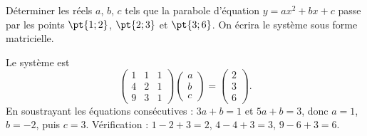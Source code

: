 \begin{exercise}
Déterminer les réels $a$, $b$, $c$ tels que la parabole d'équation $y=ax^2+bx+c$ passe par les points $\pt{1;2}$, $\pt{2;3}$ et $\pt{3;6}$. On écrira le système sous forme matricielle.
\end{exercise}
\begin{solution}
Le système est \[\begin{pmatrix}1&1&1\\4&2&1\\9&3&1\end{pmatrix}\begin{pmatrix}a\\b\\c\end{pmatrix}=\begin{pmatrix}2\\3\\6\end{pmatrix}.\] En soustrayant les équations consécutives : $3a+b=1$ et $5a+b=3$, donc $a=1$, $b=-2$, puis $c=3$. Vérification : $1-2+3=2$, $4-4+3=3$, $9-6+3=6$.
\end{solution}

\mxnewpage
